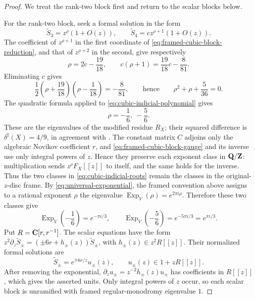 \begin{proof}
We treat the rank-two block first and return to the scalar blocks below.

For the rank-two block, seek a formal solution in the form
\[
 \widetilde S_3=z^\rho(1+O(z)),
 \qquad
 \widetilde S_4=cz^{\rho+1}(1+O(z)).
 \label{eq:cubic-indicial-ansatz}
\]
The coefficient of \(z^{\rho+1}\) in the first coordinate of
\eqref{eq:framed-cubic-block-reduction}, and that of \(z^{\rho+2}\) in
the second, give respectively
\[
 \rho=2c-\frac{19}{18},
 \qquad
 c(\rho+1)=\frac{19}{18}c-\frac8{81}.
 \label{eq:cubic-indicial-coefficients}
\]
Eliminating \(c\) gives
\[
 \frac12\left(\rho+\frac{19}{18}\right)
 \left(\rho-\frac1{18}\right)=-\frac8{81},
 \qquad\text{hence}\qquad
 \rho^2+\rho+\frac5{36}=0.
 \label{eq:cubic-indicial-polynomial}
\]
The quadratic formula applied to \eqref{eq:cubic-indicial-polynomial} gives
\[
 \rho=-\frac16,\ -\frac56.
 \label{eq:cubic-indicial-roots}
\]
These are the eigenvalues of the modified residue \(R_X\); their squared
difference is \(\delta^\sharp(X)=4/9\), in agreement with
\cite[Section~2]{RuddM1}.
The constant matrix \(C\) adjoins only the algebraic Novikov coefficient
\(r\), and \eqref{eq:framed-cubic-block-gauge} and its inverse use only
integral powers of \(z\).  Hence they preserve each exponent class in
\(\mathbf Q/\mathbf Z\): multiplication sends \(z^\rho F_X[[z]]\) to itself, and the same
holds for the inverse.  Thus the two classes in
\eqref{eq:cubic-indicial-roots} remain the classes in the original-\(z\)-disc
frame.  By \eqref{eq:universal-exponential}, the framed convention above
assigns to a rational exponent \(\rho\) the eigenvalue
\(\operatorname{Exp}_V(\rho)=e^{2\pi i\rho}\).  Therefore these two classes
give
\[
 \operatorname{Exp}_V\left(-\frac16\right)=e^{-\pi i/3},
 \qquad
 \operatorname{Exp}_V\left(-\frac56\right)
 =e^{-5\pi i/3}=e^{\pi i/3}.
 \label{eq:cubic-framed-eigenvalues}
\]
Put \(R=\mathbf C[r,r^{-1}]\).  The scalar equations have the form
\(z^2\partial_z\widetilde S_\pm=(\pm6r+h_\pm(z))\widetilde S_\pm\), with
\(h_\pm(z)\in z^2R[[z]]\).  Their normalized formal solutions are
\[
 \widetilde S_\pm=e^{\mp6r/z}u_\pm(z),
 \qquad u_\pm(z)\in1+zR[[z]].
 \label{eq:cubic-rank-one-solutions}
\]
After removing the exponential,
\(\partial_zu_\pm=z^{-2}h_\pm(z)u_\pm\) has coefficients in \(R[[z]]\),
which gives the asserted units.  Only integral powers of \(z\) occur, so each
scalar block is unramified with framed regular-monodromy eigenvalue \(1\).


\end{proof}
